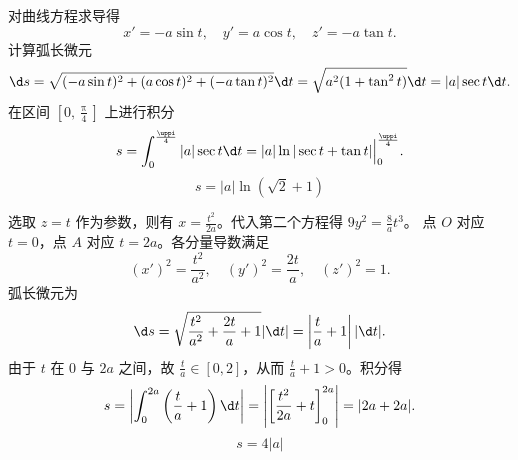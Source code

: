 \begin{solution}
    对曲线方程求导得
    \begin{equation}
        x' = -a \sin t, \quad y' = a \cos t, \quad z' = -a \tan t.
    \end{equation}
    计算弧长微元
    \begin{equation}
        \d s = \sqrt{(-a\sin t)^2 + (a\cos t)^2 + (-a\tan t)^2} \d t = \sqrt{a^2(1 + \tan^2 t)} \d t = |a| \sec t \d t.
    \end{equation}
    在区间 $[0, \frac{\uppi}{4}]$ 上进行积分
    \begin{equation}
        s = \int_{0}^{\frac{\uppi}{4}} |a| \sec t \d t = |a| \ln |\sec t + \tan t| \Big|_0^{\frac{\uppi}{4}}.
    \end{equation}
    \begin{equation}
        \boxed{s = |a| \ln (\sqrt{2} + 1)}
    \end{equation}


    选取 $z = t$ 作为参数，则有 $x = \frac{t^2}{2a}$。代入第二个方程得 $9y^2 = \frac{8}{a}t^3$。
    点 $O$ 对应 $t=0$，点 $A$ 对应 $t=2a$。各分量导数满足
    \begin{equation}
        (x')^2 = \frac{t^2}{a^2}, \quad (y')^2 = \frac{2t}{a}, \quad (z')^2 = 1.
    \end{equation}
    弧长微元为
    \begin{equation}
        \d s = \sqrt{\frac{t^2}{a^2} + \frac{2t}{a} + 1} |\d t| = \left| \frac{t}{a} + 1 \right| |\d t|.
    \end{equation}
    由于 $t$ 在 $0$ 与 $2a$ 之间，故 $\frac{t}{a} \in [0, 2]$，从而 $\frac{t}{a} + 1 > 0$。积分得
    \begin{equation}
        s = \left| \int_{0}^{2a} \left( \frac{t}{a} + 1 \right) \d t \right| = \left| \left[ \frac{t^2}{2a} + t \right]_0^{2a} \right| = |2a + 2a|.
    \end{equation}
    \begin{equation}
        \boxed{s = 4|a|}
    \end{equation}



\end{solution}

